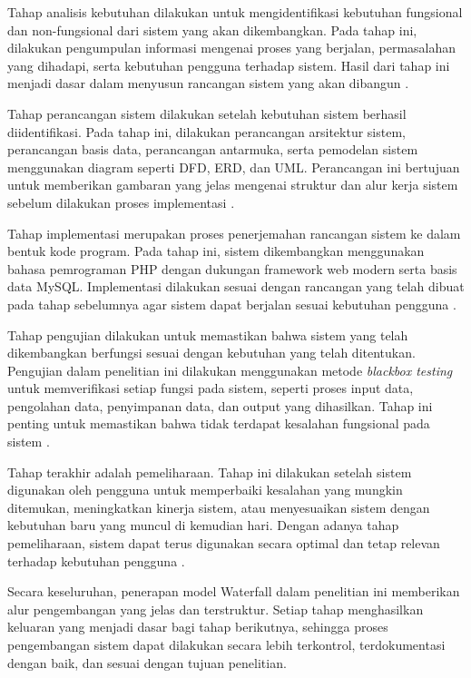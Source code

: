 \documentclass[12pt,a4paper,twoside]{report}
\begin{document}
Tahap analisis kebutuhan dilakukan untuk mengidentifikasi kebutuhan fungsional dan non-fungsional dari sistem yang akan dikembangkan. Pada tahap ini, dilakukan pengumpulan informasi mengenai proses yang berjalan, permasalahan yang dihadapi, serta kebutuhan pengguna terhadap sistem. Hasil dari tahap ini menjadi dasar dalam menyusun rancangan sistem yang akan dibangun \cite{sommerville2016}.

Tahap perancangan sistem dilakukan setelah kebutuhan sistem berhasil diidentifikasi. Pada tahap ini, dilakukan perancangan arsitektur sistem, perancangan basis data, perancangan antarmuka, serta pemodelan sistem menggunakan diagram seperti DFD, ERD, dan UML. Perancangan ini bertujuan untuk memberikan gambaran yang jelas mengenai struktur dan alur kerja sistem sebelum dilakukan proses implementasi \cite{pressman2014}.

Tahap implementasi merupakan proses penerjemahan rancangan sistem ke dalam bentuk kode program. Pada tahap ini, sistem dikembangkan menggunakan bahasa pemrograman PHP dengan dukungan framework web modern serta basis data MySQL. Implementasi dilakukan sesuai dengan rancangan yang telah dibuat pada tahap sebelumnya agar sistem dapat berjalan sesuai kebutuhan pengguna \cite{sommerville2016}.

Tahap pengujian dilakukan untuk memastikan bahwa sistem yang telah dikembangkan berfungsi sesuai dengan kebutuhan yang telah ditentukan. Pengujian dalam penelitian ini dilakukan menggunakan metode \textit{blackbox testing} untuk memverifikasi setiap fungsi pada sistem, seperti proses input data, pengolahan data, penyimpanan data, dan output yang dihasilkan. Tahap ini penting untuk memastikan bahwa tidak terdapat kesalahan fungsional pada sistem \cite{pressman2014}.

Tahap terakhir adalah pemeliharaan. Tahap ini dilakukan setelah sistem digunakan oleh pengguna untuk memperbaiki kesalahan yang mungkin ditemukan, meningkatkan kinerja sistem, atau menyesuaikan sistem dengan kebutuhan baru yang muncul di kemudian hari. Dengan adanya tahap pemeliharaan, sistem dapat terus digunakan secara optimal dan tetap relevan terhadap kebutuhan pengguna \cite{sommerville2016}.

Secara keseluruhan, penerapan model Waterfall dalam penelitian ini memberikan alur pengembangan yang jelas dan terstruktur. Setiap tahap menghasilkan keluaran yang menjadi dasar bagi tahap berikutnya, sehingga proses pengembangan sistem dapat dilakukan secara lebih terkontrol, terdokumentasi dengan baik, dan sesuai dengan tujuan penelitian.
\end{document}
